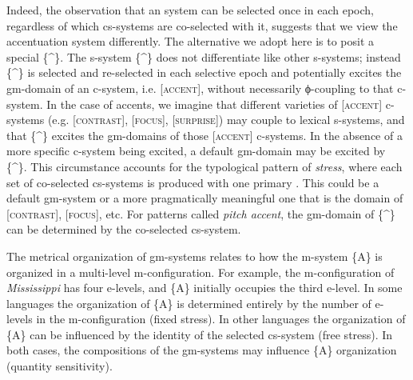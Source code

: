  Indeed, the observation that an  system can be selected once in each epoch, regardless of which cs-systems are co-selected with it, suggests that we view the accentuation system differently. The alternative we adopt here is to posit a special  \{\^{}\}. The s-system \{\^{}\} does not differentiate like other s-systems; instead \{\^{}\} is selected and re-selected in each selective epoch and potentially excites the gm-domain of an  c-system, i.e. [\textsc{accent}], without necessarily ϕ-coupling to that c-system. In the case of  accents, we imagine that different varieties of [\textsc{accent}] c-systems (e.g. [\textsc{contrast}], [\textsc{focus}], [\textsc{surprise}]) may couple to lexical s-systems, and that \{\^{}\} excites the gm-domains of those [\textsc{accent}] c-systems. In the absence of a more specific c-system being excited, a default gm-domain may be excited by \{\^{}\}. This circumstance accounts for the typological pattern of \textit{stress}, where each set of co-selected cs-systems is produced with one primary . This could be a default gm-sys\-tem or a more pragmatically meaningful one that is the domain of [\textsc{contrast}], [\textsc{focus}], etc. For patterns called \textit{pitch accent}, the gm-domain of \{\^{}\} can be determined by the co-selected cs-system.

  The metrical organization of  gm-sys\-tems relates to how the m-sys\-tem \{A\} is organized in a multi-level m-con\-fig\-u\-ra\-tion. For example, the m-con\-fig\-u\-ra\-tion of \textit{Mississippi} has four e-levels, and \{A\} initially occupies the third e-level. In some languages the organization of \{A\} is determined entirely by the number of e-levels in the m-con\-fig\-u\-ra\-tion (fixed stress). In other languages the organization of \{A\} can be influenced by the identity of the selected cs-system (free stress). In both cases, the compositions of the gm-sys\-tems may influence \{A\} organization (quantity sensitivity). 

